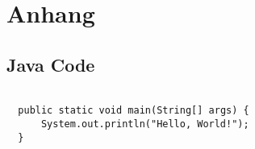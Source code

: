 \section{Anhang} \label{sec:appendix}

\subsection*{Java Code} \label{app:code}

\begin{code}
\begin{verbatim}

  public static void main(String[] args) {
      System.out.println("Hello, World!");
  }
  
\end{verbatim}

\label{code:hello-world}
\end{code}
